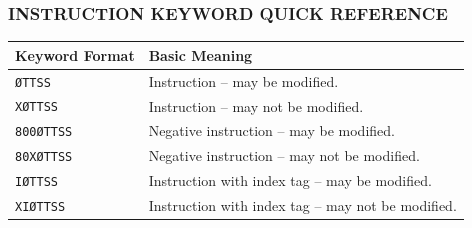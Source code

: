 \vspace{1.5em}

\subsubsection*{INSTRUCTION KEYWORD QUICK REFERENCE}

\noindent
\begin{tabular}{ll}
\toprule
\textbf{Keyword Format} & \textbf{Basic Meaning} \\
\midrule
\texttt{ØTTSS}    & Instruction -- may be modified. \\
\texttt{XØTTSS}   & Instruction -- may not be modified. \\
\texttt{800ØTTSS} & Negative instruction -- may be modified. \\
\texttt{80XØTTSS} & Negative instruction -- may not be modified. \\
\texttt{IØTTSS}    & Instruction with index tag -- may be modified. \\
\texttt{XIØTTSS}   & Instruction with index tag -- may not be modified. \\
\bottomrule
\end{tabular}

